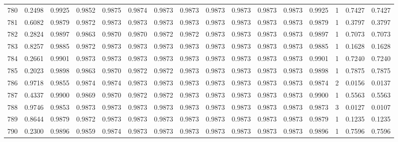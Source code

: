 \begin{tabular}{lrrrrrrrrrrrrrrr}
780 &      0.2498 &  0.9925 &  0.9852 &  0.9875 &  0.9874 &  0.9873 &  0.9873 &  0.9873 &  0.9873 &  0.9873 &   0.9873 &     0.9925 &      1 &                    0.7427 &                     0.7427 \\
781 &      0.6082 &  0.9879 &  0.9872 &  0.9873 &  0.9873 &  0.9873 &  0.9873 &  0.9873 &  0.9873 &  0.9873 &   0.9873 &     0.9879 &      1 &                    0.3797 &                     0.3797 \\
782 &      0.2824 &  0.9897 &  0.9863 &  0.9870 &  0.9870 &  0.9872 &  0.9872 &  0.9873 &  0.9873 &  0.9873 &   0.9873 &     0.9897 &      1 &                    0.7073 &                     0.7073 \\
783 &      0.8257 &  0.9885 &  0.9872 &  0.9873 &  0.9873 &  0.9873 &  0.9873 &  0.9873 &  0.9873 &  0.9873 &   0.9873 &     0.9885 &      1 &                    0.1628 &                     0.1628 \\
784 &      0.2661 &  0.9901 &  0.9873 &  0.9873 &  0.9873 &  0.9873 &  0.9873 &  0.9873 &  0.9873 &  0.9873 &   0.9873 &     0.9901 &      1 &                    0.7240 &                     0.7240 \\
785 &      0.2023 &  0.9898 &  0.9863 &  0.9870 &  0.9872 &  0.9872 &  0.9873 &  0.9873 &  0.9873 &  0.9873 &   0.9873 &     0.9898 &      1 &                    0.7875 &                     0.7875 \\
786 &      0.9718 &  0.9855 &  0.9874 &  0.9874 &  0.9873 &  0.9873 &  0.9873 &  0.9873 &  0.9873 &  0.9873 &   0.9873 &     0.9874 &      2 &                    0.0156 &                     0.0137 \\
787 &      0.4337 &  0.9900 &  0.9869 &  0.9870 &  0.9872 &  0.9872 &  0.9873 &  0.9873 &  0.9873 &  0.9873 &   0.9873 &     0.9900 &      1 &                    0.5563 &                     0.5563 \\
788 &      0.9746 &  0.9853 &  0.9873 &  0.9873 &  0.9873 &  0.9873 &  0.9873 &  0.9873 &  0.9873 &  0.9873 &   0.9873 &     0.9873 &      3 &                    0.0127 &                     0.0107 \\
789 &      0.8644 &  0.9879 &  0.9872 &  0.9873 &  0.9873 &  0.9873 &  0.9873 &  0.9873 &  0.9873 &  0.9873 &   0.9873 &     0.9879 &      1 &                    0.1235 &                     0.1235 \\
790 &      0.2300 &  0.9896 &  0.9859 &  0.9874 &  0.9873 &  0.9873 &  0.9873 &  0.9873 &  0.9873 &  0.9873 &   0.9873 &     0.9896 &      1 &                    0.7596 &                     0.7596 \\

\end{tabular}
